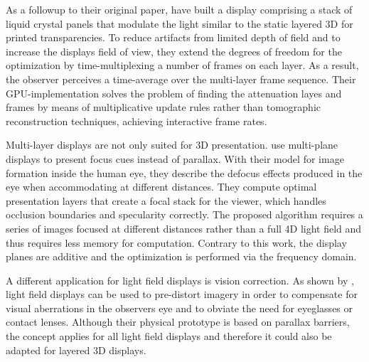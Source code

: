 As a followup to their original paper, \cite{WetzsteinTensor} have built a display comprising a stack of liquid crystal panels that modulate the light similar to the static layered 3D for printed transparencies.
To reduce artifacts from limited depth of field and to increase the displays field of view, they extend the degrees of freedom for the optimization by time-multiplexing a number of frames on each layer.
As a result, the observer perceives a time-average over the multi-layer frame sequence.
Their GPU-implementation solves the problem of finding the attenuation layes and frames by means of multiplicative update rules rather than tomographic reconstruction techniques, achieving interactive frame rates.

Multi-layer displays are not only suited for 3D presentation.
\cite{FocusCuesMultiPlaneDisplays} use multi-plane displays to present focus cues instead of parallax.
With their model for image formation inside the human eye, they describe the defocus effects produced in the eye when accommodating at different distances.
They compute optimal presentation layers that create a focal stack for the viewer, which handles occlusion boundaries and specularity correctly.
The proposed algorithm requires a series of images focused at different distances rather than a full 4D light field and thus requires less memory for computation.
Contrary to this work, the display planes are additive and the optimization is performed via the frequency domain.

A different application for light field displays is vision correction.
As shown by \cite{EyeglassesFreeDisplay}, light field displays can be used to pre-distort imagery in order to compensate for visual aberrations in the observers eye and to obviate the need for eyeglasses or contact lenses.
Although their physical prototype is based on parallax barriers, the concept applies for all light field displays and therefore it could also be adapted for layered 3D displays.